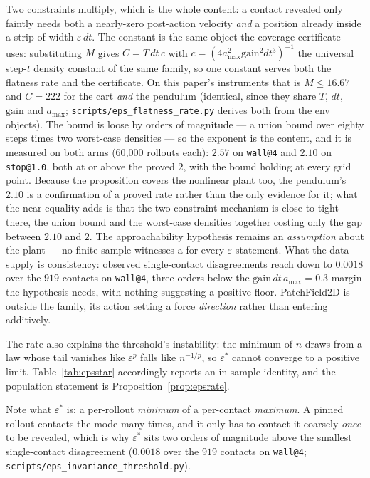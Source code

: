 \documentclass[11pt]{article}
\theoremstyle{definition}
\theoremstyle{remark}
\begin{document}
Two constraints multiply, which is the whole content: a contact revealed only faintly needs both a nearly-zero post-action velocity \emph{and} a position already inside a strip of width $\varepsilon\,dt$. The constant is the same object the coverage certificate uses: substituting $M$ gives $C = T\,dt\,c$ with $c = (4a_{\max}^2\mathrm{gain}^2dt^3)^{-1}$ the universal step-$t$ density constant of the same family, so one constant serves both the flatness rate and the certificate. On this paper's instruments that is $M \leq 16.67$ and $C = 222$ for the cart \emph{and} the pendulum (identical, since they share $T$, $dt$, $\mathrm{gain}$ and $a_{\max}$; \texttt{scripts/\allowbreak eps\_\allowbreak flatness\_\allowbreak rate.py} derives both from the env objects). The bound is loose by orders of magnitude --- a union bound over eighty steps times two worst-case densities --- so the exponent is the content, and it is measured on both arms (60{,}000 rollouts each): $2.57$ on \texttt{wall@4} and $2.10$ on \texttt{stop@1.0}, both at or above the proved $2$, with the bound holding at every grid point. Because the proposition covers the nonlinear plant too, the pendulum's $2.10$ is a confirmation of a proved rate rather than the only evidence for it; what the near-equality adds is that the two-constraint mechanism is close to tight there, the union bound and the worst-case densities together costing only the gap between $2.10$ and $2$. The approachability hypothesis remains an \emph{assumption} about the plant --- no finite sample witnesses a for-every-$\varepsilon$ statement. What the data supply is consistency: observed single-contact disagreements reach down to $0.0018$ over the $919$ contacts on \texttt{wall@4}, three orders below the $\mathrm{gain}\,dt\,a_{\max} = 0.3$ margin the hypothesis needs, with nothing suggesting a positive floor. PatchField2D is outside the family, its action setting a force \emph{direction} rather than entering additively.

The rate also explains the threshold's instability: the minimum of $n$ draws from a law whose tail vanishes like $\varepsilon^{p}$ falls like $n^{-1/p}$, so $\varepsilon^\ast$ cannot converge to a positive limit. Table~\ref{tab:epsstar} accordingly reports an in-sample identity, and the population statement is Proposition~\ref{prop:epsrate}.

Note what $\varepsilon^\ast$ is: a per-rollout \emph{minimum} of a per-contact \emph{maximum}. A pinned rollout contacts the mode many times, and it only has to contact it coarsely \emph{once} to be revealed, which is why $\varepsilon^\ast$ sits two orders of magnitude above the smallest single-contact disagreement ($0.0018$ over the $919$ contacts on \texttt{wall@4}; \texttt{scripts/eps\_invariance\_threshold.py}).
\end{document}
